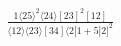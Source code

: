\documentclass[varwidth, border=5pt]{standalone}
\begin{document}
\begin{my}
$\begin{gathered}
\scriptscriptstyle\frac{1⟨25⟩^2⟨24⟩[23]^2[12]}{⟨12⟩⟨23⟩[34]⟨2|1+5|2]^2}
\end{gathered}$
\end{my}
\end{document}

